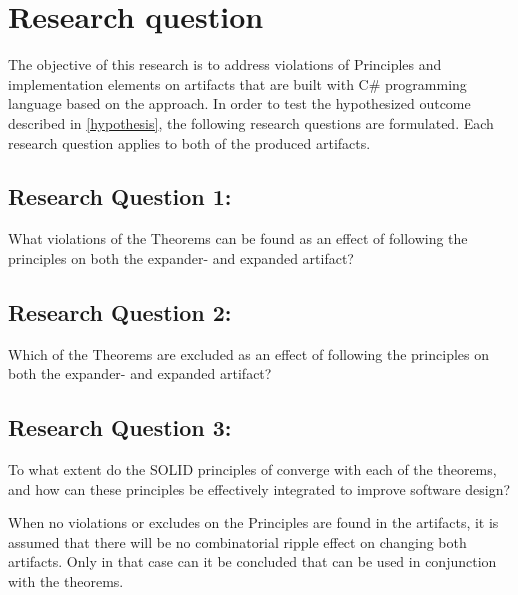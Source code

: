 \section{Research question} \label{sec_research_questions}

The objective of this research is to address violations of \ns Principles
and implementation elements on artifacts that are built with C\# programming language
based on the \ca approach. In order to test the hypothesized outcome
described in \ref{hypothesis}, the following research questions are formulated. Each
research question applies to both of the produced artifacts.

\subsection*{Research Question 1:} \label{rq1}
What violations of the \ns Theorems can be found as an effect of
following the \ca principles on both the expander- and expanded artifact?

\subsection*{Research Question 2:} \label{rq2}
Which of the \ns Theorems are excluded as an effect of following the
\ca principles on both the expander- and expanded artifact?

\subsection*{Research Question 3:} \label{rq3}
To what extent do the SOLID principles of \ca converge with each of the
\ns theorems, and how can these principles be effectively integrated to
improve software design?

When no violations or excludes on the \ns Principles are found in the
artifacts, it is assumed that there will be no combinatorial ripple effect on changing
both artifacts. Only in that case can it be concluded that \ca can be
used in conjunction with the \ns theorems. 